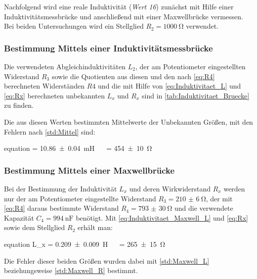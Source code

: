 	Nachfolgend wird eine reale Induktivität (\emph{Wert 16}) zunächst mit Hilfe einer Induktivitätsmessbrücke
	und anschließend mit einer Maxwellbrücke vermessen. Bei beiden Untersuchungen wird 
	ein Stellglied $R_{2} = \SI{1000}{\ohm}$ verwendet.
	
	\subsubsection{Bestimmung Mittels einer Induktivitätsmessbrücke}
	\label{sec:Auswertung_Induktivität_Messbrücke}
	
		Die verwendeten Abgleichinduktivitäten $L_{2}$, der am Potentiometer eingestellten Widerstand
		$R_{3}$ sowie die Quotienten aus diesen und den nach \cref{eq:R4} berechneten Widerständen $R4$
		und die mit Hilfe von \cref{eq:Induktivitaet_L} und \cref{eq:Rx} berechneten unbekannten $L_{x}$
		 und $R_{x}$ sind in \cref{tab:Induktivitaet_Bruecke} zu finden.    
		
		
		
		Die aus diesen Werten bestimmten Mittelwerte der Unbekannten Größen, mit den Fehlern nach \cref{std:Mittel} sind:
		\begin{empheq}{equation}
				\label{eq:LxRx_Brücke}
				 = \SI{10.86(4)}{\milli\henry} \quad\ \ \quad {} = \SI{454(10)}{\ohm}
		\end{empheq}		
		
		
	\subsubsection{Bestimmung Mittels einer Maxwellbrücke}
	\label{sec:Auswertung_Induktivität_Maxwell}
		
		Bei der Bestimmung der Induktivität $L_{x}$ und deren Wirkwiderstand $R_{x}$ werden 
		nur der am Potentiometer eingestellte Widerstand $R_{3}= \SI{210(6)}{\ohm} $, der mit \cref{eq:R4} 
		daraus bestimmte Widerstand $R_{4} = \SI{793(30)}{\ohm}$ und die verwendete Kapazität $C_{4} = 
		\SI{994}{\nano\farad}$  benötigt. Mit \cref{eq:Induktivitaet_Maxwell_L} und \cref{eq:Rx}
		sowie dem Stellglied $R_{2}$ erhält man:
		\begin{empheq}{equation}
				\label{eq:LxRx_Maxwell}
				{L_{x}} = \SI{0.209(9)}{\henry} \quad\ \  = \SI{265(15)}{\ohm}
		\end{empheq}
		Die Fehler dieser beiden Größen wurden dabei mit \cref{std:Maxwell_L}
		beziehungsweise \cref{std:Maxwell_R} bestimmt.
		
